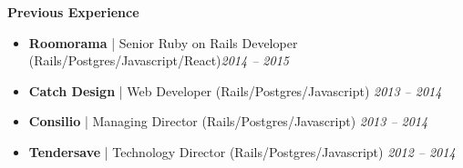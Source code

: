 \documentclass[letterpaper,10pt]{article}
\begin{document}
\textbf{Previous Experience}
\begin{itemize}[leftmargin=*, nosep]
    \item \textbf{Roomorama} | Senior Ruby on Rails Developer (Rails/Postgres/Javascript/React)\hfill \textit{2014 -- 2015}
    \item \textbf{Catch Design} | Web Developer (Rails/Postgres/Javascript) \hfill \textit{2013 -- 2014}
    \item \textbf{Consilio} | Managing Director  (Rails/Postgres/Javascript) \hfill \textit{2013 -- 2014}
    \item \textbf{Tendersave} | Technology Director (Rails/Postgres/Javascript) \hfill \textit{2012 -- 2014}
\end{itemize}
\end{document}
